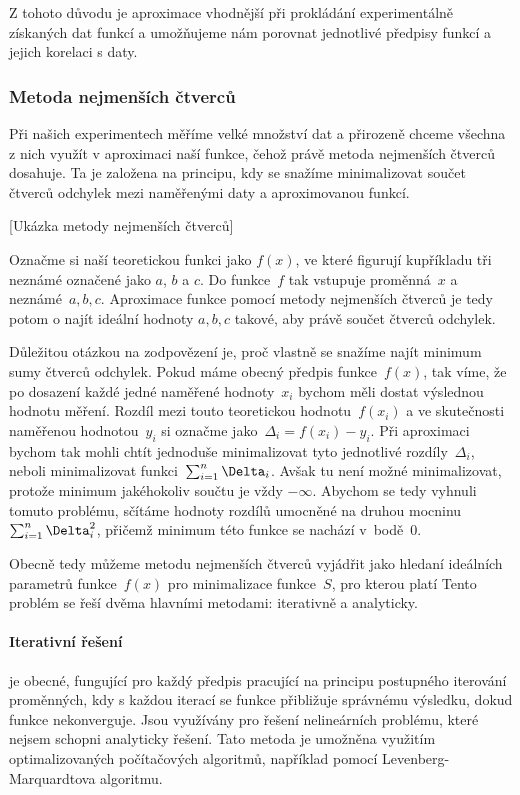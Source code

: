 Z tohoto důvodu je aproximace vhodnější při prokládání experimentálně získaných
dat funkcí a umožňujeme nám porovnat jednotlivé předpisy funkcí a jejich
korelaci s daty.

\subsubsection{Metoda nejmenších čtverců}
\label{sec:čtverce}
Při našich experimentech měříme velké množství dat a přirozeně chceme všechna
z nich využít v aproximaci naší funkce, čehož právě metoda nejmenších čtverců
dosahuje. Ta je založena na principu, kdy se snažíme minimalizovat součet
čtverců odchylek mezi naměřenými daty a aproximovanou funkcí.

[Ukázka metody nejmenších čtverců]

Označme si naší teoretickou funkci jako $f(x)$, ve které figurují kupříkladu
tři neznámé označené jako $a$, $b$ a $c$. Do funkce~$f$ tak vstupuje
proměnná~$x$ a neznámé~$a,b,c$. Aproximace funkce pomocí metody nejmenších
čtverců je tedy potom o najít ideální hodnoty $a,b,c$ takové, aby právě součet
čtverců odchylek.

Důležitou otázkou na zodpovězení je, proč vlastně se snažíme najít minimum sumy
čtverců odchylek. Pokud máme obecný předpis funkce~$f(x)$, tak víme, že po
dosazení každé jedné naměřené hodnoty~$x_i$ bychom měli dostat výslednou
hodnotu měření. Rozdíl mezi touto teoretickou hodnotu~$f(x_i)$ a ve skutečnosti
naměřenou hodnotou~$y_i$ si označme jako~$\Delta_i = f(x_i)-y_i$. Při
aproximaci bychom tak mohli chtít jednoduše minimalizovat tyto jednotlivé
rozdíly~$\Delta_i$, neboli minimalizovat funkci~$\nsum \Delta_i$. Avšak tu není
možné minimalizovat, protože minimum jakéhokoliv součtu je vždy $-\infty$.
Abychom se tedy vyhnuli tomuto problému, sčítáme hodnoty rozdílů umocněné na
druhou mocninu~$\nsum \Delta_i^2$, přičemž minimum této funkce se nachází
v~bodě~$0$.

Obecně tedy můžeme metodu nejmenších čtverců vyjádřit jako hledaní ideálních 
parametrů funkce~$f(x)$ pro minimalizace funkce~$S$, pro kterou platí
Tento problém se řeší dvěma hlavními metodami: iterativně a analyticky.

\paragraph{Iterativní řešení} je obecné, fungující pro každý předpis pracující
na principu postupného iterování proměnných, kdy s každou iterací se funkce
přibližuje správnému výsledku, dokud funkce nekonverguje. Jsou využívány pro
řešení nelineárních problému, které nejsem schopni analyticky řešení. Tato
metoda je umožněna využitím optimalizovaných počítačových algoritmů, například
pomocí Levenberg-Marquardtova algoritmu.

